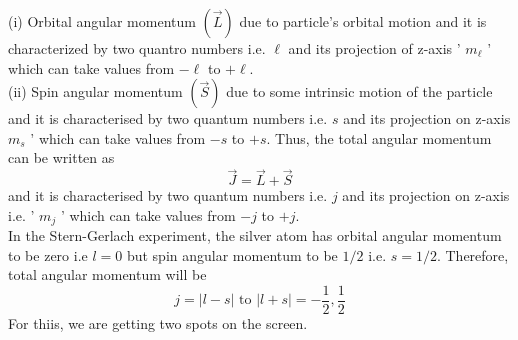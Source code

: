  (i) Orbital angular momentum $(\vec{L})$ due to particle's orbital motion and it is characterized by two quantro numbers i.e. $\ell$ and its projection of z-axis ' $m_{\ell}$ ' which can take values from $-\ell$ to $+\ell$.\\
 (ii) Spin angular momentum $(\vec{S})$ due to some intrinsic motion of the particle and it is characterised by two quantum numbers i.e. $s$ and its projection on z-axis $m_{s}$ ' which can take values from $-s$ to $+s$. Thus, the total angular momentum can be written as
 $$ \vec{J}=\vec{L}+\vec{S} $$ and it is characterised by two quantum numbers i.e. $j$ and its projection on z-axis i.e. ' $m_{j}$ ' which can take values from $-j$ to $+j$.\\
 In the Stern-Gerlach experiment, the silver atom has orbital angular momentum to be zero i.e $l=0$ but spin angular momentum to be $1 / 2$ i.e. $s=1 / 2$. Therefore, total angular momentum will be
 $$
 j=|l-s| \text { to }|l+s|=-\frac{1}{2}, \frac{1}{2}
 $$
 For thiis, we are getting two spots on the screen.\\
